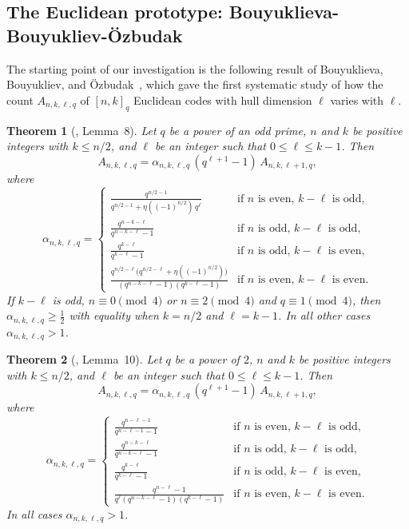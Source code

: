 \documentclass[10pt,a4paper]{amsart}
\newtheorem{theorem}{Theorem}
\begin{document}
\subsection{The Euclidean prototype: Bouyuklieva-Bouyukliev-\"Ozbudak}\label{sec:prelim-bbo}

The starting point of our investigation is the following result of Bouyuklieva,
Bouyukliev, and \"Ozbudak~\cite{BBOz2026}, which gave the first systematic study of
how the count $A_{n,k,\ell,q}$ of $[n,k]_q$ Euclidean codes with hull dimension $\ell$
varies with $\ell$.

\begin{theorem}[\cite{BBOz2026}, Lemma~8]\label{thm:BBO-odd}
Let $q$ be a power of an odd prime, $n$ and $k$ be positive integers with
$k \leq n/2$, and $\ell$ be an integer such that $0 \leq \ell \leq k - 1$. Then
\[
  A_{n,k,\ell,q} = \alpha_{n,k,\ell,q}\,(q^{\ell+1} - 1)\,A_{n,k,\ell+1,q},
\]
where
\[
  \alpha_{n,k,\ell,q} = \begin{cases}
    \displaystyle\frac{q^{n/2-1}}{q^{n/2-1} + \eta((-1)^{n/2})\,q^\ell}
      & \text{if $n$ is even, $k - \ell$ is odd}, \\[8pt]
    \displaystyle\frac{q^{n-k-\ell}}{q^{n-k-\ell} - 1}
      & \text{if $n$ is odd, $k - \ell$ is odd}, \\[8pt]
    \displaystyle\frac{q^{k-\ell}}{q^{k-\ell} - 1}
      & \text{if $n$ is odd, $k - \ell$ is even}, \\[8pt]
    \displaystyle\frac{q^{n/2-\ell}\bigl(q^{n/2-\ell} + \eta((-1)^{n/2})\bigr)}
                       {(q^{n-k-\ell}-1)(q^{k-\ell}-1)}
      & \text{if $n$ is even, $k - \ell$ is even}.
  \end{cases}
\]
If $k - \ell$ is odd, $n \equiv 0 \pmod 4$ or
$n \equiv 2 \pmod 4$ and $q \equiv 1 \pmod 4$, then
$\alpha_{n,k,\ell,q} \geq \tfrac{1}{2}$ with equality when $k = n/2$ and
$\ell = k - 1$. In all other cases $\alpha_{n,k,\ell,q} > 1$.
\end{theorem}

\begin{theorem}[\cite{BBOz2026}, Lemma~10]\label{thm:BBO-even}
Let $q$ be a power of $2$, $n$ and $k$ be positive integers with $k \leq n/2$,
and $\ell$ be an integer such that $0 \leq \ell \leq k - 1$. Then
\[
  A_{n,k,\ell,q} = \alpha_{n,k,\ell,q}\,(q^{\ell+1} - 1)\,A_{n,k,\ell+1,q},
\]
where
\[
  \alpha_{n,k,\ell,q} = \begin{cases}
    \displaystyle\frac{q^{n-\ell-1}}{q^{n-\ell-1} - 1}
      & \text{if $n$ is even, $k - \ell$ is odd}, \\[8pt]
    \displaystyle\frac{q^{n-k-\ell}}{q^{n-k-\ell} - 1}
      & \text{if $n$ is odd, $k - \ell$ is odd}, \\[8pt]
    \displaystyle\frac{q^{k-\ell}}{q^{k-\ell} - 1}
      & \text{if $n$ is odd, $k - \ell$ is even}, \\[8pt]
    \displaystyle\frac{q^{n-\ell}-1}{q^\ell(q^{n-k-\ell}-1)(q^{k-\ell}-1)}
      & \text{if $n$ is even, $k - \ell$ is even}.
  \end{cases}
\]
In all cases $\alpha_{n,k,\ell,q} > 1$.
\end{theorem}
\end{document}
